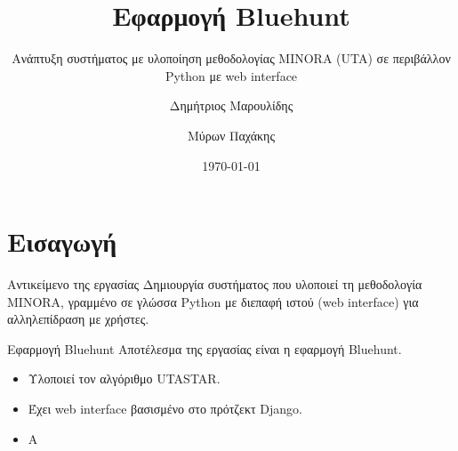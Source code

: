 \documentclass{beamer}
\title{Εφαρμογή Bluehunt}
\subtitle{Ανάπτυξη συστήματος με υλοποίηση μεθοδολογίας MINORA (UTA) σε περιβάλλον Python με web interface}
\author{Δημήτριος Μαρουλίδης \and Μύρων Παχάκης}
\institute{Πολυτεχνείο Κρήτης}
\date{\today}
\begin{document}
\begin{frame}[plain]
    \maketitle
\end{frame}

\section{Εισαγωγή}
\begin{frame}{Αντικείμενο της εργασίας}
    Δημιουργία συστήματος που υλοποιεί τη μεθοδολογία MINORA, γραμμένο σε γλώσσα Python με διεπαφή ιστού 
    (web interface) για αλληλεπίδραση με χρήστες.
\end{frame}
\begin{frame}{Εφαρμογή Bluehunt}
    Αποτέλεσμα της εργασίας είναι η εφαρμογή Bluehunt.
    
    \begin{itemize}
        \item Υλοποιεί τον αλγόριθμο UTASTAR.
        \item Έχει web interface βασισμένο στο πρότζεκτ Django.
        \item A
    \end{itemize}
\end{frame}
\end{document}
